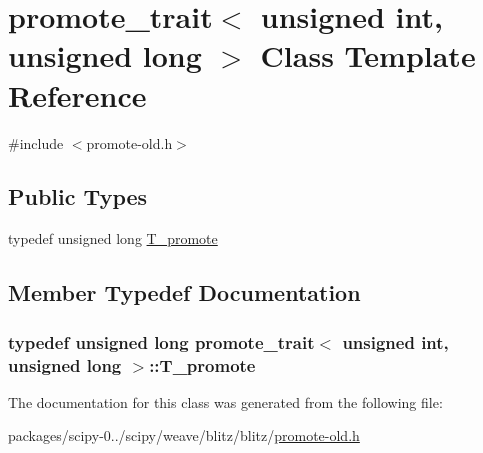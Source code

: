 \hypertarget{classpromote__trait_3_01unsigned_01int_00_01unsigned_01long_01_4}{}\section{promote\+\_\+trait$<$ unsigned int, unsigned long $>$ Class Template Reference}
\label{classpromote__trait_3_01unsigned_01int_00_01unsigned_01long_01_4}


{\ttfamily \#include $<$promote-\/old.\+h$>$}

\subsection*{Public Types}
\begin{DoxyCompactItemize}
\item 
typedef unsigned long \hyperlink{classpromote__trait_3_01unsigned_01int_00_01unsigned_01long_01_4_a16a2cef2af5224e4af5f82d1cf4891f2}{T\+\_\+promote}
\end{DoxyCompactItemize}


\subsection{Member Typedef Documentation}
\hypertarget{classpromote__trait_3_01unsigned_01int_00_01unsigned_01long_01_4_a16a2cef2af5224e4af5f82d1cf4891f2}{}
\subsubsection[{T\+\_\+promote}]{\setlength{\rightskip}{0pt plus 5cm}typedef unsigned long {\bf promote\+\_\+trait}$<$ unsigned int, unsigned long $>$\+::{\bf T\+\_\+promote}}\label{classpromote__trait_3_01unsigned_01int_00_01unsigned_01long_01_4_a16a2cef2af5224e4af5f82d1cf4891f2}


The documentation for this class was generated from the following file\+:\begin{DoxyCompactItemize}
\item 
packages/scipy-\/0../scipy/weave/blitz/blitz/\hyperlink{promote-old_8h}{promote-\/old.\+h}\end{DoxyCompactItemize}
